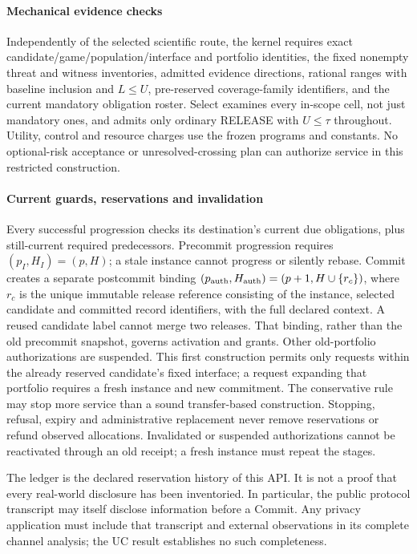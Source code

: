 \paragraph{Mechanical evidence checks}
Independently of the selected scientific route, the kernel requires exact
candidate/game/population/interface and portfolio identities, the fixed
nonempty threat and witness inventories, admitted evidence directions,
rational ranges with baseline inclusion and $L\le U$, pre-reserved
coverage-family identifiers, and the current mandatory obligation roster.
Select examines every in-scope cell, not just mandatory ones, and admits
only ordinary RELEASE with $U\le\tau$ throughout.
Utility, control and resource charges use the frozen programs and constants.
No optional-risk acceptance or unresolved-crossing plan can authorize
service in this restricted construction.

\paragraph{Current guards, reservations and invalidation}
Every successful progression checks its destination's current due
obligations, plus still-current required predecessors. Precommit progression
requires $(p_I,H_I)=(p,H)$; a stale instance cannot progress or silently rebase.
Commit creates a separate postcommit binding
$(p_{\rm auth},H_{\rm auth})=(p+1,H\cup\{r_c\})$,
where $r_c$ is the unique immutable release reference consisting of the
instance, selected candidate and committed record identifiers, with the
full declared context. A reused candidate label cannot merge two releases.
That binding, rather than the old precommit snapshot, governs activation
and grants. Other old-portfolio authorizations are suspended.
This first construction permits only requests within the already reserved
candidate's fixed interface; a request expanding that portfolio requires
a fresh instance and new commitment. The conservative rule may stop more
service than a sound transfer-based construction. Stopping, refusal, expiry
and administrative replacement never remove reservations or refund
observed allocations. Invalidated or suspended authorizations cannot be
reactivated through an old receipt; a fresh instance must repeat the stages.

The ledger is the declared reservation history of this API.
It is not a proof that every real-world disclosure has been inventoried.
In particular, the public protocol transcript may itself disclose
information before a Commit. Any privacy application must include that
transcript and external observations in its complete channel analysis;
the UC result establishes no such completeness.

